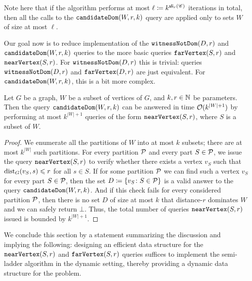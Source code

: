 Note here that if the algorithm performs at most $\ell\coloneqq k^{\sli_r(\Cc)}$ iterations in total, then all the calls to the $\candidate{W,r,k}$ query are applied only to sets $W$ of size at most $\ell$.

Our goal now is to reduce implementation of the $\notDominated{D,r}$ and $\candidate{W,r,k}$ queries to the more basic queries $\far{S,r}$ and $\near{S,r}$. For $\notDominated{D,r}$ this is trivial: queries $\notDominated{D,r}$ and $\far{D,r}$ are just equivalent. For $\candidate{W,r,k}$, this is a bit more complex.

\begin{lemma}\label{lem:candidate-to-near}
	Let $G$ be a graph, $W$ be a subset of vertices of $G$, and $k,r\in \N$ be parameters. Then the query $\candidate{W,r,k}$ can be answered in time $\Oh(k^{|W|+1})$ by performing at most $k^{|W|+1}$ queries of the form $\near{S,r}$, where $S$ is a subset of $W$.
\end{lemma}
\begin{proof}
	We enumerate all
	the partitions of $W$ into at most $k$ subsets; there are at most $k^{|W|}$ such partitions. For every partition $\cal P$ and every part $S\in \cal P$, we issue the query $\near{S,r}$ to verify whether there exists a vertex $v_S$ such that $\dist_G(v_S,s)\leq r$ for all $s\in S$. If for some partition $\cal P$ we can find such a vertex $v_S$ for every part $S\in \cal P$, then the set $D\coloneqq \{v_S\colon S\in \cal P\}$ is a valid answer to the query $\candidate{W,r,k}$. And if this check fails for every considered partition $\cal P$, then there is no set $D$ of size at most $k$ that distance-$r$ dominates $W$ and we can safely return $\bot$.
	Thus, the total
	number of queries $\near{S,r}$ issued is bounded by
	$k^{|W|+1}$.
\end{proof}

We conclude this section by a statement summarizing the discussion and implying the following: designing an efficient data structure for the $\near{S,r}$ and $\far{S,r}$ queries suffices to implement the semi-ladder algorithm in the dynamic setting, thereby providing a dynamic data structure for the  problem.

